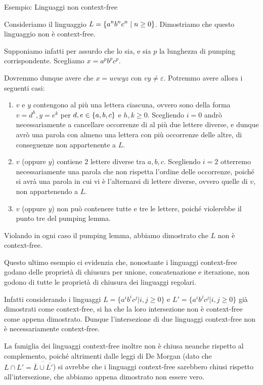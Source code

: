 \begin{generalbox}[colframe=azure-gradient-3!90!black]{Esempio: Linguaggi non context-free}

  Consideriamo il linguaggio $L=\displaystyle{\left\{{a^{n}b^{n}c^{n} \mid n \geq 0}\right\}}$. Dimostriamo che questo linguaggio non è context-free.

  \bigskip

  Supponiamo infatti per assurdo che lo sia, e sia $p$ la lunghezza di pumping corrispondente. Scegliamo $x=a^{p}b^{p}c^{p}$.

  Dovremmo dunque avere che $x=uvwyz$ con $vy \neq \varepsilon$. Potremmo avere allora i seguenti casi:

  \begin{enumerate}
    \item $v$ e $y$ contengono al più una lettera ciascuna, ovvero sono della forma $v=d^h,y=e^k$ per $d,e \in \displaystyle{\left\{{a,b,c}\right\}}$ e $h,k \geq 0$. Scegliendo $i=0$ andrò necessariamente a cancellare occorrenze di al più due lettere diverse, e dunque avrò una parola con almeno una lettera con più occorrenze delle altre, di conseguenze non appartenente a $L$.
    \item $v$ (oppure $y$) contiene $2$ lettere diverse tra $a,b,c$. Scegliendo $i=2$ otterremo necessariamente una parola che non rispetta l'ordine delle occorrenze, poiché si avrà una parola in cui vi è l'alternarsi di lettere diverse, ovvero quelle di $v$, non appartenendo a $L$.
    \item $v$ (oppure $y$) non può contenere tutte e tre le lettere, poiché violerebbe il punto tre del pumping lemma.
  \end{enumerate}

  Violando in ogni caso il pumping lemma, abbiamo dimostrato che $L$ non è context-free.

\end{generalbox}

Questo ultimo esempio ci evidenzia che, nonostante i linguaggi context-free godano delle proprietà di chiusura per unione, concatenazione e iterazione, non godono di tutte le proprietà di chiusura dei linguaggi regolari.

Infatti considerando i linguaggi $L=\{a^{i}b^{i}c^{j} \vert i,j \geq 0\}$ e $L'=\{a^{i}b^{j}c^{j} \vert i,j \geq 0\}$ già dimostrati come context-free, si ha che la loro intersezione non è context-free come appena dimostrato. Dunque l'intersezione di due linguaggi context-free non è necessariamente context-free.

La famiglia dei linguaggi context-free inoltre non è chiusa neanche rispetto al complemento, poiché altrimenti dalle leggi di De Morgan (dato che $L \cap L' = \overline{\overline{L} \cup \overline{L'}}$) si avrebbe che i linguaggi context-free sarebbero chiusi rispetto all'intersezione, che abbiamo appena dimostrato non essere vero.

